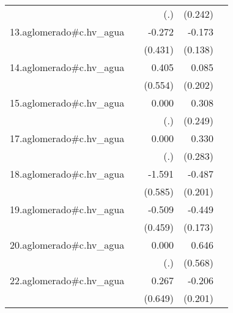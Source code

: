 {\begin{longtable}{l*{4}{D{.}{.}{-1}}}
            &                     &         (.)         &     (0.242)         &                     \\
\addlinespace
13.aglomerado#c.hv\_agua&                     &      -0.272         &      -0.173         &                     \\
            &                     &     (0.431)         &     (0.138)         &                     \\
\addlinespace
14.aglomerado#c.hv\_agua&                     &       0.405         &       0.085         &                     \\
            &                     &     (0.554)         &     (0.202)         &                     \\
\addlinespace
15.aglomerado#c.hv\_agua&                     &       0.000         &       0.308         &                     \\
            &                     &         (.)         &     (0.249)         &                     \\
\addlinespace
17.aglomerado#c.hv\_agua&                     &       0.000         &       0.330         &                     \\
            &                     &         (.)         &     (0.283)         &                     \\
\addlinespace
18.aglomerado#c.hv\_agua&                     &      -1.591\sym{**} &      -0.487\sym{*}  &                     \\
            &                     &     (0.585)         &     (0.201)         &                     \\
\addlinespace
19.aglomerado#c.hv\_agua&                     &      -0.509         &      -0.449\sym{**} &                     \\
            &                     &     (0.459)         &     (0.173)         &                     \\
\addlinespace
20.aglomerado#c.hv\_agua&                     &       0.000         &       0.646         &                     \\
            &                     &         (.)         &     (0.568)         &                     \\
\addlinespace
22.aglomerado#c.hv\_agua&                     &       0.267         &      -0.206         &                     \\
            &                     &     (0.649)         &     (0.201)         &                     \\

\end{longtable}}
